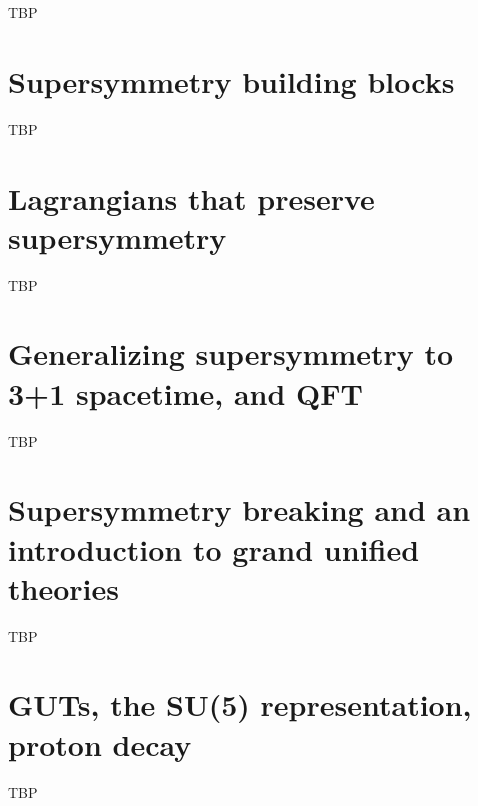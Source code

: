 \documentclass[]{article}
\begin{document}
TBP

\section{Supersymmetry building blocks}

TBP

\section{Lagrangians that preserve supersymmetry}

TBP

\section{Generalizing supersymmetry to 3+1 spacetime, and QFT}

TBP

\section{Supersymmetry breaking and an introduction to grand unified theories}

TBP

\section{GUTs, the SU(5) representation, proton decay}

TBP



\raggedright

\end{document}
